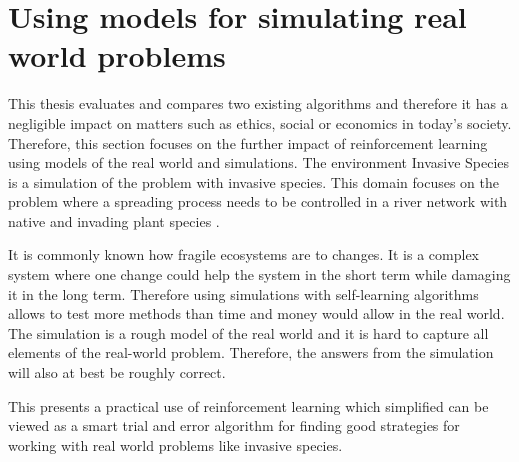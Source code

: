 \section{Using models for simulating real world problems}
\label{sec:ethics_inv_spec}

This thesis evaluates and compares two existing algorithms and therefore it has
a negligible impact on matters such as ethics, social or economics in today's
society. Therefore, this section focuses on the further impact of reinforcement learning using models of the real world and simulations. The environment Invasive Species is a simulation of the problem with invasive
species. This domain focuses on the problem where a spreading process needs to be controlled in a
river network with native and invading plant species
\parencite{invasiveSpecis2014:Online}. 

It is commonly known how fragile ecosystems are to changes. It is a complex
system where one change could help the system in the short term while damaging it in the long
term. Therefore using simulations with self-learning algorithms allows to test
more methods than time and money would allow in the real world. The simulation is a rough model
of the real world and it is hard to capture all elements of the real-world
problem. Therefore, the answers from the simulation will also at best be roughly
correct.

This presents a practical use of reinforcement learning which simplified can be
viewed as a smart trial and error algorithm for finding good strategies for
working with real world problems like invasive species.
